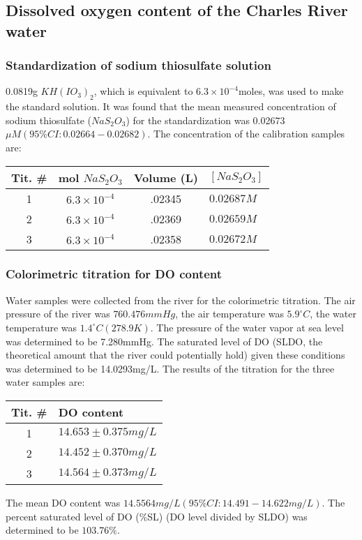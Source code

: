 \subsection{Dissolved oxygen content of the Charles River water}
\subsubsection{Standardization of sodium thiosulfate solution}
0.0819g $KH(IO_3)_2$, which is equivalent to $6.3\times10^{-4}$moles, was used to make the standard solution. It was found that the mean measured concentration of sodium thiosulfate ($NaS_2O_3$) for the standardization was 0.02673$\mu M (95\% CI: 0.02664 − 0.02682)$.  
The concentration of the calibration samples are:
\begin{center}
    \begin{tabular}{ | c|  c | c | l |}
    \hline
    Tit. \# & mol $NaS_2O_3 $  & Volume (L) & $[NaS_2O_3]$\\ \hline
    1 & $6.3\times10^{-4}$ & .02345 & $0.02687M$ \\ \hline
    2 & $6.3\times10^{-4}$ & .02369 & $0.02659M$ \\ \hline
    3 & $6.3\times10^{-4}$ & .02358 & $0.02672M$ \\ \hline
    \end{tabular}
\end{center}
\subsubsection{Colorimetric titration for DO content}
Water samples were collected from the river for the colorimetric titration. The air pressure of the river was $760.476mmHg$, the air temperature was $5.9^{\circ}C$, the water temperature was $1.4^{\circ}C (278.9K)$. The pressure of the water vapor at sea level was determined to be 7.280mmHg. The saturated level of DO (SLDO, the theoretical amount that the river could potentially hold) given these conditions was determined to be 14.0293mg/L. 
The results of the titration for the three water samples are:
 \begin{center}
    \begin{tabular}{ | c| l |}
    \hline
    Tit. \# & DO content\\ \hline
    1 & $14.653 \pm 0.375mg/L$  \\ \hline
    2 & $14.452 \pm 0.370mg/L$ \\ \hline
    3 & $14.564 \pm 0.373mg/L$ \\ \hline
    \end{tabular}
\end{center}
The mean DO content was $14.5564mg/L (95\%CI:14.491 - 14.622 mg/L)$.  The percent saturated level of DO (\%SL) (DO level divided by SLDO) was determined to be $103.76\%$. 


